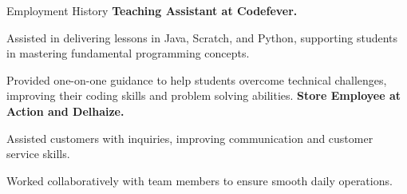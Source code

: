 \begin{rubric}{Employment History}
    \entry*[2023 - To Date]%
        \textbf{Teaching Assistant at Codefever.}\par
        Assisted in delivering lessons in Java, Scratch, and Python, 
        supporting students in mastering fundamental programming 
        concepts.
        \par
        Provided one-on-one guidance to help students overcome 
        technical challenges, improving their coding skills and problem
        solving abilities. 
    \entry*[2021 -- 2024]%
        \textbf{Store Employee at Action and Delhaize.}\par
        Assisted customers with inquiries, improving communication and 
        customer service skills. 
        \par
        Worked collaboratively with team members to ensure smooth 
        daily operations.
    \end{rubric}